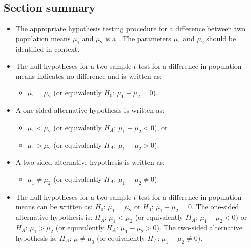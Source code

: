 \subsection*{Section summary}
\begin{itemize} 

\item The appropriate hypothesis testing procedure for a difference between two population means $\mu_1$ and $\mu_2$ is a . The parameters $\mu_1$ and $\mu_2$ should be identified in context.


\item The null hypotheses for a two-sample $t$-test for a difference in population means indicates no difference and is written as:  
\begin{itemize}
\setlength{\itemindent}{3mm}
\item[$H_0$:] $\mu_1=\mu_2$ (or equivalently $H_0$: $\mu_1-\mu_2 = 0$).  
\end{itemize}
\item A one-sided alternative hypothesis is written as: 
\begin{itemize}
\setlength{\itemindent}{3mm}
\item[$H_A$:] $\mu_1<\mu_2$ (or equivalently $H_A$: $\mu_1-\mu_2<0$), or
\item[$H_A$:] $\mu_1>\mu_2$ (or equivalently $H_A$: $\mu_1-\mu_2>0$).
\end{itemize}

\item[] A two-sided alternative hypothesis is written as: 
\begin{itemize}
\setlength{\itemindent}{3mm}
\item[$H_A$:] $\mu_1\ne \mu_2$ (or equivalently $H_A$: $\mu_1-\mu_2\ne 0$).
\end{itemize}



\item The null hypotheses for a two-sample $t$-test for a difference in population means can be written as:  $H_0$: $\mu_1 = \mu_2$ or $H_0$: $\mu_1-\mu_2=0$.  The one-sided alternative hypothesis is: $H_A$: $\mu_1<\mu_2$ (or equivalently $H_A$: $\mu_1-\mu_2<0$) or $H_A$: $\mu_1>\mu_2$ (or equivalently $H_A$: $\mu_1-\mu_2>0$).  The two-sided alternative hypothesis is: $H_A$: $\mu\ne \mu_0$ (or equivalently  $H_A$: $\mu_1-\mu_2 \ne 0$).


\end{itemize}
